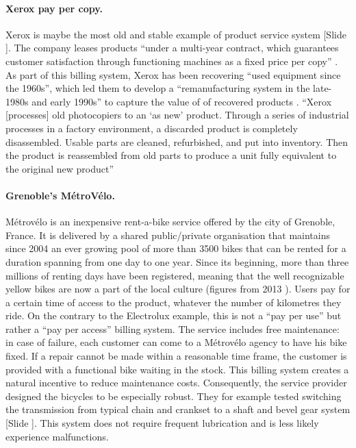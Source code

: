 \documentclass{article}
\newcounter{slide}
\begin{document}
\paragraph{Xerox pay per copy.}\label{Xerox}
Xerox is maybe the most old and stable example of product service system {\color{blue}[Slide ]}. The company leases products ``under a multi-year contract, which guarantees customer satisfaction through functioning machines as a fixed price per copy'' \cite{montProductserviceSystemsPanacea2004}. As part of this billing system, Xerox has been recovering ``used equipment since the 1960s'', which led them to develop a ``remanufacturing system in the late-1980s and early 1990s'' to capture the value of of recovered products \cite{kingPhotocopierRemanufacturingXerox2006}. ``Xerox [processes] old photocopiers to an `as new' product. Through a series of industrial processes in a factory environment, a discarded product is completely disassembled. Usable parts are cleaned, refurbished, and put into inventory. Then the product is reassembled from old parts to produce a unit fully equivalent to the original new product'' \cite{kingPhotocopierRemanufacturingXerox2006}

\paragraph{Grenoble's MétroVélo.}\label{MetroVelo} Métrovélo is an inexpensive rent-a-bike service offered by the city of Grenoble, France. It is delivered by a shared public/private organisation that maintains since 2004 an ever growing pool of more than 3500 bikes that can be rented for a duration spanning from one day to one year. Since its beginning, more than three millions of renting days have been registered, meaning that the well recognizable yellow bikes are now a part of the local culture (figures from 2013 \cite{bonvoisinOpennessSupportiveParadigm2013}). Users pay for a certain time of access to the product, whatever the number of kilometres they ride. On the contrary to the Electrolux example, this is not a ``pay per use'' but rather a ``pay per access'' billing system. The service includes free maintenance: in case of failure, each customer can come to a Métrovélo agency to have his bike fixed. If a repair cannot be made within a reasonable time frame, the customer is provided with a functional bike waiting in the stock. This billing system creates a natural incentive to reduce maintenance costs. Consequently,  the service provider designed the bicycles to be especially robust. They for example tested switching the transmission from typical chain and crankset to a shaft and bevel gear system {\color{blue}[Slide ]}. This system does not require frequent lubrication and is less likely experience malfunctions. 
\end{document}
